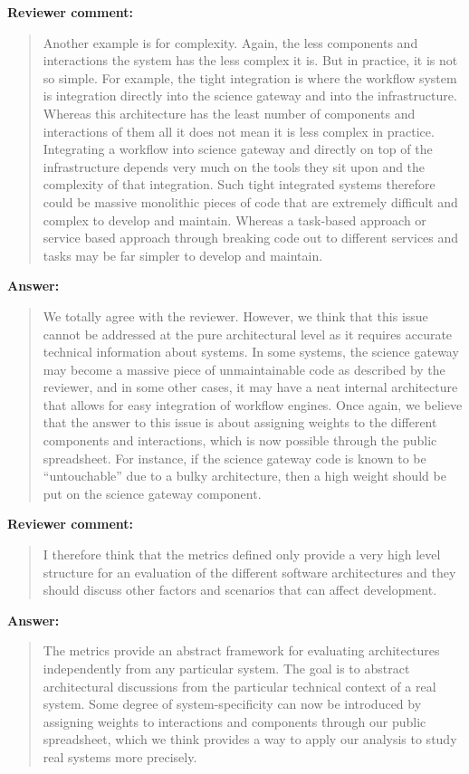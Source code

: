 \documentclass[a4]{article}
\newenvironment{review}%
{\textbf{Reviewer comment:}\begin{quote}}%
{\end{quote}}%
\newenvironment{answer}%
{\textbf{Answer:}\begin{small}\begin{quote}}%
{\end{quote}\end{small}}%
\begin{document}
\begin{review}
  Another example is for complexity.  Again, the less components and
  interactions the system has the less complex it is. But in practice,
  it is not so simple. For example, the tight integration is where the
  workflow system is integration directly into the science gateway and
  into the infrastructure. Whereas this architecture has the least
  number of components and interactions of them all it does not mean
  it is less complex in practice. Integrating a workflow into science
  gateway and directly on top of the infrastructure depends very much
  on the tools they sit upon and the complexity of that
  integration. Such tight integrated systems therefore could be
  massive monolithic pieces of code that are extremely difficult and
  complex to develop and maintain.  Whereas a task-based approach or
  service based approach through breaking code out to different
  services and tasks may be far simpler to develop and maintain.
\end{review}

\begin{answer}
  We totally agree with the reviewer. However, we think that this
  issue cannot be addressed at the pure architectural level as it
  requires accurate technical information about systems. In some
  systems, the science gateway may become a massive piece of
  unmaintainable code as described by the reviewer, and in some other
  cases, it may have a neat internal architecture that allows for easy
  integration of workflow engines. Once again, we believe that the
  answer to this issue is about assigning weights to the different
  components and interactions, which is now possible through the
  public spreadsheet. For instance, if the science gateway code is
  known to be ``untouchable'' due to a bulky architecture, then a high weight
  should be put on the science gateway component. 
\end{answer}

\begin{review}
  I therefore think that the metrics defined only provide a very high
  level structure for an evaluation of the different software
  architectures and they should discuss other factors and scenarios
  that can affect development. 
\end{review}

\begin{answer}
  The metrics provide an abstract framework for evaluating
  architectures independently from any particular system. The goal is
  to abstract architectural discussions from the particular technical
  context of a real system. Some degree of system-specificity can now
  be introduced by assigning weights to interactions and components
  through our public spreadsheet, which we think provides a way to apply our
  analysis to study real systems more precisely.
\end{answer}
\end{document}
